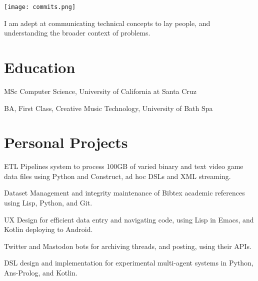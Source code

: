 \documentclass[%
]{komacv}
\begin{document}
\raggedbottom{}
\maketitle
\setsansfont{Fira Code}
\raggedright{}
\setsansfont{AnnapurnaSIL-Regular.ttf}

\texttt{[image: commits.png]}

 I am adept at communicating technical concepts to lay people, and understanding the broader context of problems.

\section{Education}
\begin{compactitem}
  \item {MSc Computer Science, University of California at Santa Cruz}
  \item BA, First Class, Creative Music Technology, University of Bath Spa
\end{compactitem}

\section{Personal Projects}
\begin{compactitem}
    \item ETL Pipelines system to process 100GB of varied binary and text video game data files using Python and Construct, ad hoc DSLs and XML streaming.
    \item Dataset Management and integrity maintenance of Bibtex academic references using Lisp, Python, and Git.
    \item UX Design for efficient data entry and navigating code, using Lisp in Emacs, and Kotlin deploying to Android.
    \item Twitter and Mastodon bots for archiving threads, and posting, using their APIs.
    \item DSL design and implementation for experimental multi-agent systems in Python, Ans-Prolog, and Kotlin.
\end{compactitem}
\end{document}
